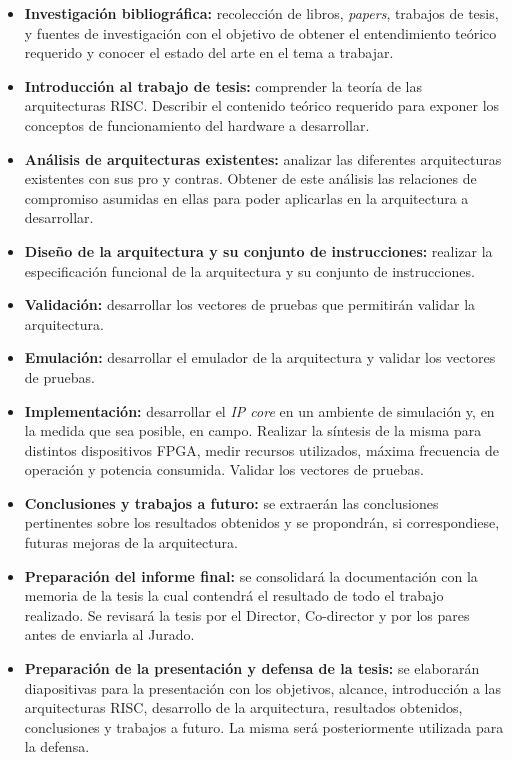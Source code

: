\documentclass[a4paper]{article}
\begin{document}
\begin{itemize}
    \item \textbf{Investigación bibliográfica:} recolección de libros, \emph{papers}, trabajos de tesis, y fuentes de investigación con el objetivo de obtener el entendimiento teórico requerido y conocer el estado del arte en el tema a trabajar.
    \item \textbf{Introducción al trabajo de tesis:} comprender la teoría de las arquitecturas RISC. Describir el contenido teórico requerido para exponer los conceptos de funcionamiento del hardware a desarrollar.
    \item \textbf{Análisis de arquitecturas existentes:} analizar las diferentes arquitecturas existentes con sus pro y contras. Obtener de este análisis las relaciones de compromiso asumidas en ellas para poder aplicarlas en la arquitectura a desarrollar.
    \item \textbf{Diseño de la arquitectura y su conjunto de instrucciones:} realizar la especificación funcional de la arquitectura y su conjunto de instrucciones.
    \item \textbf{Validación:} desarrollar los vectores de pruebas que permitirán validar la arquitectura.
    \item \textbf{Emulación:} desarrollar el emulador de la arquitectura y validar los vectores de pruebas.
    \item \textbf{Implementación:} desarrollar el \emph{IP core} en un ambiente de simulación y, en la medida que sea posible, en campo. Realizar la síntesis de la misma para distintos dispositivos FPGA, medir recursos utilizados, máxima frecuencia de operación y potencia consumida. Validar los vectores de pruebas.
    \item \textbf{Conclusiones y trabajos a futuro:} se extraerán las conclusiones pertinentes sobre los resultados obtenidos y se propondrán, si correspondiese, futuras mejoras de la arquitectura.
    \item \textbf{Preparación del informe final:} se consolidará la documentación con la memoria de la tesis la cual contendrá el resultado de todo el trabajo realizado. Se revisará la tesis por el Director, Co-director y por los pares antes de enviarla al Jurado.
    \item \textbf{Preparación de la presentación y defensa de la tesis:} se elaborarán diapositivas para la presentación con los objetivos, alcance, introducción a las arquitecturas RISC, desarrollo de la arquitectura, resultados obtenidos, conclusiones y trabajos a futuro. La misma será posteriormente utilizada para la defensa.
\end{itemize}
\end{document}
